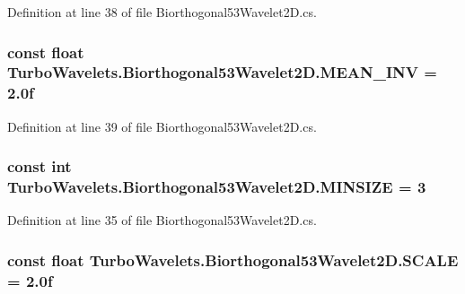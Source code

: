 Definition at line 38 of file Biorthogonal53\+Wavelet2\+D.\+cs.

\hypertarget{class_turbo_wavelets_1_1_biorthogonal53_wavelet2_d_a087508fa3e1f6e94477310a061d09784}{
\subsubsection[{M\+E\+A\+N\+\_\+\+I\+N\+V}]{\setlength{\rightskip}{0pt plus 5cm}const float Turbo\+Wavelets.\+Biorthogonal53\+Wavelet2\+D.\+M\+E\+A\+N\+\_\+\+I\+N\+V = 2.\+0f\hspace{0.3cm}{\ttfamily [protected]}}}\label{class_turbo_wavelets_1_1_biorthogonal53_wavelet2_d_a087508fa3e1f6e94477310a061d09784}


Definition at line 39 of file Biorthogonal53\+Wavelet2\+D.\+cs.

\hypertarget{class_turbo_wavelets_1_1_biorthogonal53_wavelet2_d_aa6981c16a1765d4664747274676d5eba}{
\subsubsection[{M\+I\+N\+S\+I\+Z\+E}]{\setlength{\rightskip}{0pt plus 5cm}const int Turbo\+Wavelets.\+Biorthogonal53\+Wavelet2\+D.\+M\+I\+N\+S\+I\+Z\+E = 3\hspace{0.3cm}{\ttfamily [protected]}}}\label{class_turbo_wavelets_1_1_biorthogonal53_wavelet2_d_aa6981c16a1765d4664747274676d5eba}


Definition at line 35 of file Biorthogonal53\+Wavelet2\+D.\+cs.

\hypertarget{class_turbo_wavelets_1_1_biorthogonal53_wavelet2_d_af0ccd844200200f57839dea6823daaa6}{
\subsubsection[{S\+C\+A\+L\+E}]{\setlength{\rightskip}{0pt plus 5cm}const float Turbo\+Wavelets.\+Biorthogonal53\+Wavelet2\+D.\+S\+C\+A\+L\+E = 2.\+0f\hspace{0.3cm}{\ttfamily [protected]}}}\label{class_turbo_wavelets_1_1_biorthogonal53_wavelet2_d_af0ccd844200200f57839dea6823daaa6}


